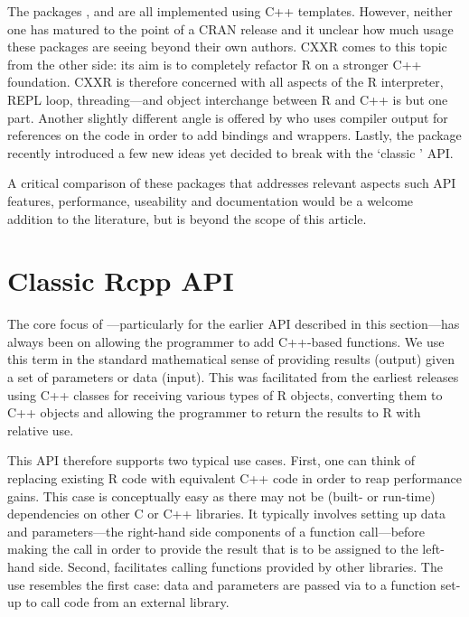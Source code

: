 The packages  \citep{liang08:rcppbind}, 
\citep{armstrong09:RAbstraction} and 
\citep{armstrong09:RObjects} are all implemented using C++ templates.
However, neither one has matured to the point of a CRAN release and it
unclear how much usage these packages are seeing beyond their own authors.
%
CXXR \citep{runnalls09:cxxr} comes to this topic from the other side: 
its aim is to completely refactor R on a stronger C++ foundation. 
CXXR is therefore concerned with all aspects of the R interpreter,
REPL loop, threading---and object interchange between R and C++ is but one part.
%
Another slightly different angle is offered by
\cite{templelang09:rgcctranslationunit} who uses compiler output for
references on the code in order to add bindings and wrappers.
%
Lastly, the  package \citep{samperi09:rcpptemplate}
recently introduced a few new ideas yet decided to break with the
`classic ' API.

A critical comparison of these packages that addresses relevant aspects such
API features, performance, useability and documentation would be a welcome
addition to the literature, but is beyond the scope of this article.

\section{Classic Rcpp API}
\label{sec:classic_rcpp}

The core focus of ---particularly for the earlier API described in
this section---has always been on allowing the programmer to add C++-based
functions. We use this term in the standard mathematical sense of providing
results (output) given a set of parameters or data (input). This was
facilitated from the earliest releases using C++ classes for receiving
various types of R objects, converting them to C++ objects and allowing the
programmer to return the results to R with relative use. 

This API therefore supports two typical use cases. First, one can think of
replacing existing R code with equivalent C++ code in order to reap
performance gains.  This case is conceptually easy as there may not be
(built- or run-time) dependencies on other C or C++ libraries.  It typically
involves setting up data and parameters---the right-hand side components of a
function call---before making the call in order to provide the result that is
to be assigned to the left-hand side. Second,  facilitates calling
functions provided by other libraries. The use resembles the first case: data
and parameters are passed via  to a function set-up to call code
from an external library.  

